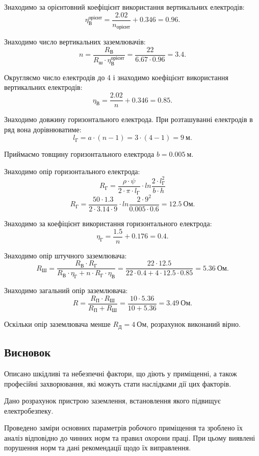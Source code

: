 \documentclass[a4paper,12pt]{article}
\begin{document}
Знаходимо за \cite{dzunzuk} орієнтовний коефіцієнт використання вертикальних електродів:
\[
\eta_\text{В}^\text{орієнт} = \frac{2.02}{n_\text{орієнт}} + 0.346 = 0.96.
\]

Знаходимо число вертикальних заземлювачів:
\[
n = \frac{R_\text{В}}{R_\text{ш}\cdot \eta_\text{В}^\text{орієнт}} = \frac{22}{6.67\cdot 0.96} = 3.4.
\]

Округляємо число електродів до 4 і знаходимо коефіцієнт використання вертикальних електродів:
\[
\eta_\text{В} = \frac{2.02}{n} + 0.346 = 0.85.
\]

Знаходимо довжину горизонтального електрода. При розташуванні електродів в ряд вона дорівнюватиме:
\[
l_\text{Г} = a \cdot (n - 1) = 3 \cdot (4 - 1) = 9\ \text{м}.
\]

Приймаємо товщину горизонтального електрода $b = 0.005\ \text{м}$.

Знаходимо опір горизонтального електрода:
\[
R_\text{Г} = \frac{\rho \cdot \psi}{2 \cdot \pi \cdot l_\text{Г}} \cdot ln \frac{2 \cdot l_\text{Г}^2}{b \cdot h}
\]
\[
R_\text{Г} = \frac{50 \cdot 1.3}{2 \cdot 3.14 \cdot 9} \cdot ln \frac{2 \cdot 9^2}{0.005 \cdot 0.6} = 12.5\ \text{Ом}.
\]

Знаходимо за \cite{dzunzuk} коефіцієнт використання горизонтального електрода:
\[
\eta_\text{Г} = \frac{1.5}{n} + 0.176 = 0.4.
\]

Знаходимо опір штучного заземлювача:
\[
R_\text{Ш} = \frac{R_\text{В} \cdot R_\text{Г}}{R_\text{В} \cdot \eta_\text{Г} + n \cdot R_\text{Г} \cdot \eta_\text{В}} = \frac{22 \cdot 12.5}{22 \cdot 0.4 + 4 \cdot 12.5 \cdot 0.85} = 5.36\ \text{Ом}.
\]

Знаходимо загальний опір заземлювача:
\[
R = \frac{R_\text{П} \cdot R_\text{Ш}}{R_\text{П} + R_\text{Ш}} = \frac{10 \cdot 5.36}{10 + 5.36} = 3.49\ \text{Ом}.
\]

Оскільки опір заземлювача менше $R_\text{Д}=4\ \text{Ом}$, розрахунок виконаний вірно.

\subsection{Висновок}
Описано шкідливі та небезпечні фактори, що діють у приміщенні, а також професійні захворювання, які можуть стати наслідками дії цих факторів.

Дано розрахунок пристрою заземлення, встановлення якого підвищує електробезпеку.

Проведено заміри основних параметрів робочого приміщення та зроблено їх аналіз відповідно до чинних норм та правил охорони праці. При цьому виявлені порушення норм та дані рекомендації щодо їх виправлення.
\end{document}
